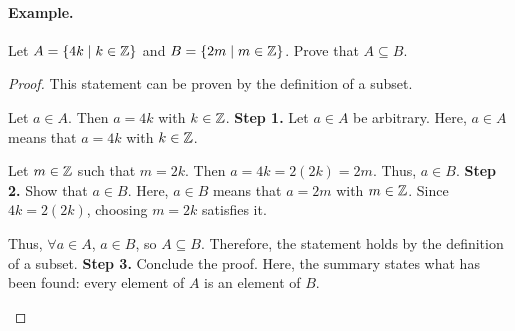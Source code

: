 \paragraph{Example.}
\begin{exercise}{
    Let $A = \{4k \mid k \in \mathbb{Z}\}$ and $B = \{2m \mid m \in \mathbb{Z}\}$. %
    Prove that $A \subseteq B$.
}
\end{exercise}
\begin{proof}{
    This statement can be proven by the definition of a subset.

    \begin{annotatedpanel}[Setup.]{
        Let $a \in A$. %
        Then $a = 4k$ with $k \in \mathbb{Z}$.
    }{
        \textbf{Step 1.} Let $a \in A$ be arbitrary. %
        Here, $a \in A$ means that $a = 4k$ with $k \in \mathbb{Z}$.
    }
    \end{annotatedpanel}

    \begin{annotatedpanel}[Verification.]{
        Let $m \in \mathbb{Z}$ such that $m = 2k$. %
        Then $a = 4k = 2(2k) = 2m$. %
        Thus, $a \in B$.
    }{
        \textbf{Step 2.} Show that $a \in B$. %
        Here, $a \in B$ means that $a = 2m$ with $m \in \mathbb{Z}$. %
        Since $4k = 2(2k)$, choosing $m = 2k$ satisfies it.
    }
    \end{annotatedpanel}

    \begin{annotatedpanel}[Conclusion.]{
        Thus, $\forall a \in A$, $a \in B$, so $A \subseteq B$. %
        Therefore, the statement holds by the definition of a subset. %
        \qedhere
    }{
        \textbf{Step 3.} Conclude the proof. %
        Here, the summary states what has been found: %
        every element of $A$ is an element of $B$.
    }
    \end{annotatedpanel}
}
\end{proof}